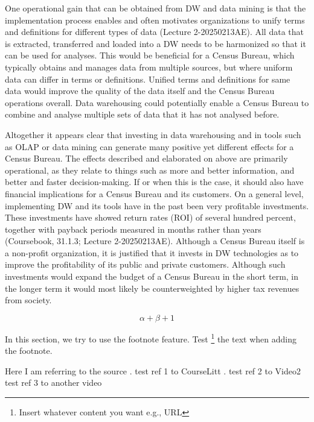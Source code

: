 One operational gain that can be obtained from DW and data mining is that the implementation process enables and often motivates organizations to
 unify terms and definitions for different types of data (Lecture 2-20250213AE). 
 All data that is extracted, transferred and loaded into a DW needs to be harmonized so that it can be used for analyses. 
 This would be beneficial for a Census Bureau, which typically obtains and manages data from multiple sources, 
 but where uniform data can differ in terms or definitions. 
 Unified terms and definitions for same data would improve the quality of the data itself and the Census Bureau operations overall.
 Data warehousing could potentially enable a Census Bureau to combine and analyse multiple sets of data that it has not analysed before.

 
Altogether it appears clear that investing in data warehousing and in tools such as OLAP or data mining can generate many positive yet 
different effects for a Census Bureau. 
The effects described and elaborated on above are primarily operational, as they relate to things such as more and better information,
 and better and faster decision-making. 
 If or when this is the case, it should also have financial implications for a Census Bureau and its customers.
On a general level, implementing DW and its tools have in the past been very profitable investments. 
These investments have showed return rates (ROI) of several hundred percent,
 together with payback periods measured in months rather than years (Coursebook, 31.1.3; Lecture 2-20250213AE). 
 Although a Census Bureau itself is a non-profit organization, 
 it is justified that it invests in DW technologies as to improve the profitability of its public and private customers. 
 Although such investments would expand the budget of a Census Bureau in the short term, 
 in the longer term it would most likely be counterweighted by higher tax revenues from society.


\newpage 
\begin{equation}
\alpha + \beta + 1
\end{equation}

In this section, we try to use the footnote feature. 
Test \footnote{Insert whatever content you want e.g., URL} the text when adding the footnote.

Here I am referring to the source \cite{DataScience}.
test ref 1 to CourseLitt \cite{CourseLitt}.
test ref 2 to Video2 \cite{l2video}
test ref 3 to another video \cite{l3video}